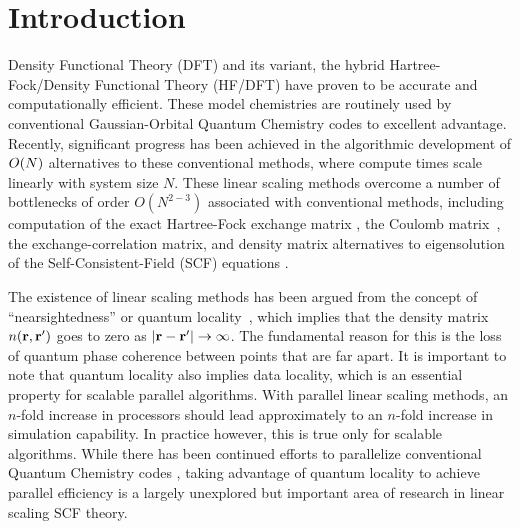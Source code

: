 \commentoutA{\documentclass[prb,aps,twocolumn,twocolumngrid]{revtex4}}
\begin{document}
\maketitle

\section{Introduction}
\label{sec:intro}
Density Functional Theory (DFT) and its variant, the hybrid Hartree-Fock/Density Functional Theory (HF/DFT) 
have proven to be accurate and computationally efficient.  These model chemistries are routinely used by 
conventional Gaussian-Orbital Quantum Chemistry codes to excellent advantage.   Recently, significant 
progress has been achieved in the algorithmic development of ${\cal }O(N)$ alternatives to these conventional 
methods, where compute times scale linearly with system size $N$\cite{Goedecker99,SWu02}.  
These linear scaling methods overcome a number of  bottlenecks of order $O(N^{2-3})$ associated with conventional methods, including
computation of the exact Hartree-Fock exchange matrix
\cite{ESchwegler96,ESchwegler97,ESchwegler98A,ESchwegler98C,ESchwegler99,ESchwegler00}, 
the Coulomb matrix~\cite{CWhite94B,CWhite96A,MChallacombe96,MChallacombe96B,MStrain96,MChallacombe97},
the exchange-correlation matrix\cite{Jorda95,RStratmann96,CGuerra98,MChallacombe00A},
and density matrix alternatives to eigensolution of the Self-Consistent-Field (SCF)
equations 
\cite{XLi93,MDaw93,SQiu94,EHernandez95B,Hernandez96,CMGoringe97,ADaniels97,DBowler99B,APalser99,MChallacombe99,ANiklasson02A,ANiklasson02B}.

The existence of linear scaling methods has been argued from the
concept of ``nearsightedness'' or quantum locality~\cite{WKohn95,WKohn96}, which implies that the density matrix
$n({\bf r},{\bf r'})$ goes to zero as $|{\bf r}-{\bf r'}| \rightarrow
\infty$. The fundamental reason for this is the loss of quantum phase
coherence between points that are far apart.  
It is important to note that quantum locality also implies data locality, 
which is an essential property for scalable parallel algorithms. 
With parallel linear scaling methods, an $n$-fold increase in processors 
should lead approximately to an $n$-fold increase in simulation capability. 
In practice however, this is true only for scalable algorithms.  
While there has been continued efforts to parallelize conventional Quantum Chemistry codes 
\cite{Harrison_94v45,Guerra_95,Sosa_98v19,Stephan_98v108,Furlani_00v128,Sosa_00v26,Yoshihiro_01v346,Baker_02v23,HTakashima02},
taking advantage of quantum  locality to achieve parallel efficiency is a largely
unexplored but important area of research in linear scaling SCF theory.
\end{document}
